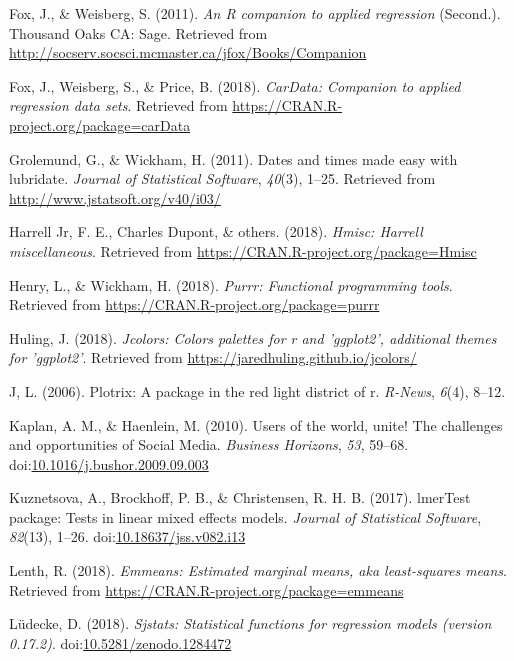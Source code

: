 \documentclass[man, fleqn, noextraspace]{apa6}
\theoremstyle{definition}
\theoremstyle{definition}
\theoremstyle{definition}
\theoremstyle{remark}
\begin{document}
\hypertarget{ref-R-car}{}
Fox, J., \& Weisberg, S. (2011). \emph{An R companion to applied
regression} (Second.). Thousand Oaks CA: Sage. Retrieved from
\url{http://socserv.socsci.mcmaster.ca/jfox/Books/Companion}

\hypertarget{ref-R-carData}{}
Fox, J., Weisberg, S., \& Price, B. (2018). \emph{CarData: Companion to
applied regression data sets}. Retrieved from
\url{https://CRAN.R-project.org/package=carData}

\hypertarget{ref-R-lubridate}{}
Grolemund, G., \& Wickham, H. (2011). Dates and times made easy with
lubridate. \emph{Journal of Statistical Software}, \emph{40}(3), 1--25.
Retrieved from \url{http://www.jstatsoft.org/v40/i03/}

\hypertarget{ref-R-Hmisc}{}
Harrell Jr, F. E., Charles Dupont, \& others. (2018). \emph{Hmisc:
Harrell miscellaneous}. Retrieved from
\url{https://CRAN.R-project.org/package=Hmisc}

\hypertarget{ref-R-purrr}{}
Henry, L., \& Wickham, H. (2018). \emph{Purrr: Functional programming
tools}. Retrieved from \url{https://CRAN.R-project.org/package=purrr}

\hypertarget{ref-R-jcolors}{}
Huling, J. (2018). \emph{Jcolors: Colors palettes for r and 'ggplot2',
additional themes for 'ggplot2'}. Retrieved from
\url{https://jaredhuling.github.io/jcolors/}

\hypertarget{ref-R-plotrix}{}
J, L. (2006). Plotrix: A package in the red light district of r.
\emph{R-News}, \emph{6}(4), 8--12.

\hypertarget{ref-Kaplan2010}{}
Kaplan, A. M., \& Haenlein, M. (2010). Users of the world, unite! The
challenges and opportunities of Social Media. \emph{Business Horizons},
\emph{53}, 59--68.
doi:\href{https://doi.org/10.1016/j.bushor.2009.09.003}{10.1016/j.bushor.2009.09.003}

\hypertarget{ref-R-lmerTest}{}
Kuznetsova, A., Brockhoff, P. B., \& Christensen, R. H. B. (2017).
lmerTest package: Tests in linear mixed effects models. \emph{Journal of
Statistical Software}, \emph{82}(13), 1--26.
doi:\href{https://doi.org/10.18637/jss.v082.i13}{10.18637/jss.v082.i13}

\hypertarget{ref-R-emmeans}{}
Lenth, R. (2018). \emph{Emmeans: Estimated marginal means, aka
least-squares means}. Retrieved from
\url{https://CRAN.R-project.org/package=emmeans}

\hypertarget{ref-R-sjstats}{}
Lüdecke, D. (2018). \emph{Sjstats: Statistical functions for regression
models (version 0.17.2)}.
doi:\href{https://doi.org/10.5281/zenodo.1284472}{10.5281/zenodo.1284472}
\end{document}
